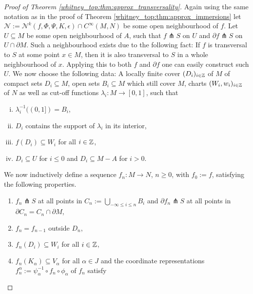 \begin{proof}[Proof of Theorem \ref{whitney_top:thm:approx_transversality}]

     Again using the same notation as in the proof of Theorem \ref{whitney_top:thm:approx_immersions} let $\mathcal{N} := \mathcal{N}^k(f,\Phi,\Psi,K,\epsilon) \cap C^\infty(M,N)$ be some open neighbourhood of $f$. Let $U \subseteq M$ be some open neighbourhood of $A$, such that $f \pitchfork S$ on $U$ and $\partial f \pitchfork S$ on $U \cap \partial M$. Such a neighbourhood exists due to the following fact: If $f$ is transversal to $S$ at some point $x \in M$, then it is also transversal to $S$ in a whole neighbourhood of $x$. Applying this to both $f$ and $\partial f$ one can easily construct such $U$. We now choose the following data: A locally finite cover $(D_i)_{i \in \mathbb{Z}}$ of $M$ of compact sets $D_i \subseteq M$, open sets $B_i \subseteq M$ which still cover $M$, charts $(W_i,w_i)_{i \in \mathbb{Z}}$ of $N$ as well as cut-off functions $\lambda_i \colon M \to [0,1]$, such that 
    \begin{enumerate}[(i)]
        \item \label{whitney_top:eq:transversality_cover_property1}$\lambda_i^{-1}((0,1]) = B_i$,
        \item \label{whitney_top:eq:transversality_cover_property2}$D_i$ contains the support of $\lambda_i$ in its interior,
        \item $f(D_i) \subseteq W_i$ for all $i \in \mathbb{Z}$,
        \item \label{whitney_top:eq:transversality_cover_property4}$D_i \subseteq U$ for $i \leq 0$ and $D_i \subseteq M - A$ for $i >0$.
    \end{enumerate}
    We now inductively define a sequence $f_n \colon M \to N$, $n \geq 0$, with $f_0 := f$, satisfying the following properties.
    \begin{enumerate}[1)]
        \item \label{whitney_top:eq:transversality_property_1} $f_n \pitchfork S$ at all points in $C_n := \bigcup_{-\infty \leq i \leq n} B_i$ and $\partial f_n \pitchfork S$ at all points in $\partial C_n = C_n \cap \partial M$,
        \item \label{whitney_top:eq:transversality_property_2} $f_n = f_{n-1}$ outside $D_n$,
        \item \label{whitney_top:eq:transversality_property_3} $f_n(D_i) \subseteq W_i$ for all $i \in \mathbb{Z}$,
        \item \label{whitney_top:eq:transversality_property_4} $f_n(K_\alpha) \subseteq V_\alpha$ for all $\alpha \in J$ and the coordinate representations $f_n^\alpha := \psi^{-1}_\alpha \circ f_n \circ \phi_\alpha$ of $f_n$ satisfy 

\end{enumerate}
\end{proof}
